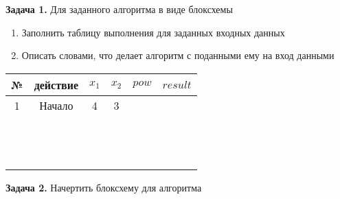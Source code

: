 \documentclass[a4paper,10pt]{article}
\begin{document}
 


\textbf{Задача 1.} Для заданного алгоритма в виде блоксхемы
\begin{enumerate}
 \item Заполнить таблицу выполнения для заданных входных данных
 \item Описать словами, что делает алгоритм с поданными ему на вход данными
\end{enumerate}




\begin{tabular}[c]{c|c|c|c|c|c}
\textbf{№} & \textbf{действие} & $x_1$ & $x_2$ & \textbf{$pow$} & \textbf{$result$}\\\hline
1 & Начало & 4 & 3 & & \\\hline
  &        &   &   & & \\\hline
  &        &   &   & & \\\hline
  &        &   &   & & \\\hline
  &        &   &   & & \\\hline
  &        &   &   & & \\\hline
  &        &   &   & & \\\hline
  &        &   &   & & \\\hline
  &        &   &   & & \\\hline
  &        &   &   & & \\\hline
  &        &   &   & & \\\hline
  &        &   &   & & \\\hline
  &        &   &   & & \\\hline
  &        &   &   & & \\
\end{tabular}


\newpage
\textbf{Задача 2.} Начертить блоксхему для алгоритма


\vspace{\fill}
\newpage
\end{document}
